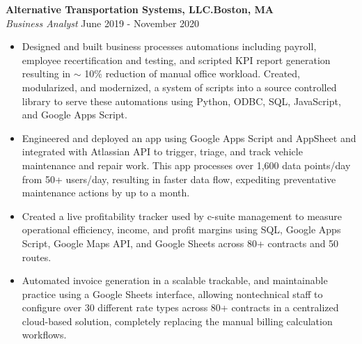 \documentclass[a4paper]{article}
\begin{document}
\textbf{Alternative Transportation Systems, LLC.\hfill Boston, MA}\\
\textit{Business Analyst} \hfill June 2019 - November 2020\\
\vspace{-1mm}
\begin{itemize} \itemsep 1pt
	\item Designed and built business processes automations including payroll, employee recertification and testing, and scripted KPI report generation resulting in $\sim$ 10\% reduction of manual office workload. 
    Created, modularized, and modernized, a system of scripts into a source controlled library to serve these automations using Python, ODBC, SQL, JavaScript, and Google Apps Script.
	\item Engineered and deployed an app using Google Apps Script and AppSheet and integrated with Atlassian API to trigger, triage, and track vehicle maintenance and repair work. This app processes over 1,600 data points/day from 50+ users/day, resulting in faster data flow, expediting preventative maintenance actions by up to a month.
	\item Created a live profitability tracker used by c-suite management to measure operational efficiency, income, and profit margins using SQL, Google Apps Script, Google Maps API, and Google Sheets across 80+ contracts and 50 routes.
	\item Automated invoice generation in a scalable trackable, and maintainable practice using a Google Sheets interface, allowing nontechnical staff to configure over 30 different rate types across 80+ contracts in a centralized cloud-based solution, completely replacing the manual billing calculation workflows.
\end{itemize}
\end{document}

